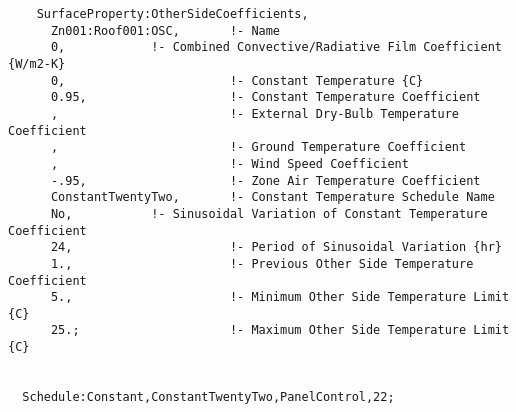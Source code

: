 \begin{lstlisting}
    SurfaceProperty:OtherSideCoefficients,
      Zn001:Roof001:OSC,       !- Name
      0,            !- Combined Convective/Radiative Film Coefficient {W/m2-K}
      0,                       !- Constant Temperature {C}
      0.95,                    !- Constant Temperature Coefficient
      ,                        !- External Dry-Bulb Temperature Coefficient
      ,                        !- Ground Temperature Coefficient
      ,                        !- Wind Speed Coefficient
      -.95,                    !- Zone Air Temperature Coefficient
      ConstantTwentyTwo,       !- Constant Temperature Schedule Name
      No,           !- Sinusoidal Variation of Constant Temperature Coefficient
      24,                      !- Period of Sinusoidal Variation {hr}
      1.,                      !- Previous Other Side Temperature Coefficient
      5.,                      !- Minimum Other Side Temperature Limit {C}
      25.;                     !- Maximum Other Side Temperature Limit {C}


  Schedule:Constant,ConstantTwentyTwo,PanelControl,22;
\end{lstlisting}
